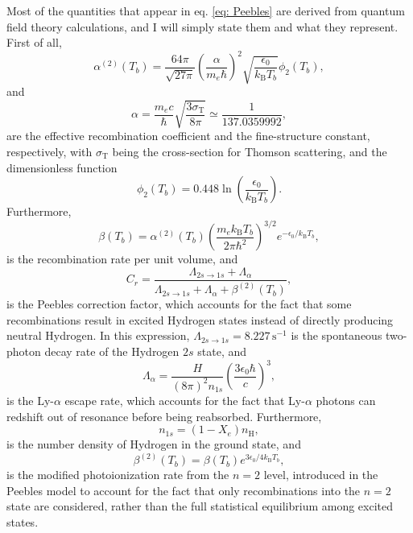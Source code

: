\documentclass{aa}
\numberwithin{equation}{section}
\numberwithin{table}{section}
\numberwithin{figure}{section}
\begin{document}
Most of the quantities that appear in eq. \eqref{eq: Peebles} are derived from quantum field theory calculations, and I will simply state them and what they represent. First of all,
\begin{equation}
  \alpha^{(2)}(T_b) = \frac{64\pi}{\sqrt{27\pi}}\left(\frac{\alpha}{m_e\hbar}\right)^2\sqrt{\frac{\epsilon_0}{k_\text{B}T_b}}\phi_2(T_b),
\end{equation}
and
\begin{equation}
  \alpha = \frac{m_ec}{\hbar}\sqrt{\frac{3\sigma_\text{T}}{8\pi}} \simeq \frac{1}{137.0359992},
\end{equation}
are the effective recombination coefficient and the fine-structure constant, respectively, with $\sigma_\text{T}$ being the cross-section for Thomson scattering, and the dimensionless function
\begin{equation}
  \phi_2(T_b) = 0.448\ln\left(\frac{\epsilon_0}{k_\text{B}T_b}\right).
\end{equation}
Furthermore,
\begin{equation}
  \beta(T_b) = \alpha^{(2)}(T_b)\left(\frac{m_ek_\text{B}T_b}{2\pi\hbar^2}\right)^{3/2}e^{-\epsilon_0/k_\text{B}T_b},
\end{equation}
is the recombination rate per unit volume, and 
\begin{equation}
  C_r = \frac{\Lambda_{2s \to 1s} + \Lambda_{\alpha}}{\Lambda_{2s \to 1s} + \Lambda_{\alpha} + \beta^{(2)}(T_b)},
\end{equation}
is the Peebles correction factor, which accounts for the fact that some recombinations result in excited Hydrogen states instead of directly producing neutral Hydrogen. In this expression, $\Lambda_{2s \to 1s}=8.227\,\text{s}^{-1}$ is the spontaneous two-photon decay rate of the Hydrogen $2s$ state, and 
\begin{equation}
  \Lambda_{\alpha} = \frac{H}{(8\pi)^2n_{1s}}\left(\frac{3\epsilon_0\hbar}{c} \right)^3,
\end{equation}
is the Ly-$\alpha$ escape rate, which accounts for the fact that Ly-$\alpha$ photons can redshift out of resonance before being reabsorbed. Furthermore, 
\begin{equation}
  n_{1s} = (1-X_e)n_\text{H},
\end{equation}
is the number density of Hydrogen in the ground state, and
\begin{equation}
  \beta^{(2)}(T_b) = \beta(T_b)e^{3\epsilon_0/4k_\text{B}T_b},
\end{equation}
is the modified photoionization rate from the $n=2$ level, introduced in the Peebles model to account for the fact that only recombinations into the $n=2$ state are considered, rather than the full statistical equilibrium among excited states.
\end{document}
